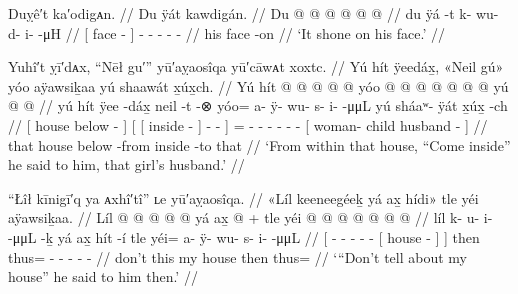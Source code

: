 \ex\label{ex:89-179-shone-on-his-face}%
%
\begingl
	\glpreamble	Duỵê′t ka′odigᴀn. //
	\glpreamble	Du ÿát kawdigán. //
	\gla	{} Du  @ {} {}
		 @ {} @ {} @ {} @ {} @ {} //
	\glb	{} du ÿá -t {}
		k- wu- d- i-  -μH //
	\glc	{}[  face - {}]
		- - - -  - //
	\gld	{} his face -on {}
		 {} {} {} {} {} //
	\glft	‘It shone on his face.’
		//
\endgl
\xe

\ex\label{ex:89-180-come-inside-that-girls-husband}%
%
\begingl
	\glpreamble	Yuhî′t ỵī′dᴀx, “Nēł gu′” yū′aỵaosîqa yū′cāwᴀt xoxtc. //
	\glpreamble	Yú hít ÿeedáx̱, «\!Neil gú\!» yóo aÿawsiḵaa yú shaawát x̱úx̱ch. //
	\gla	{} Yú hít  @ {} {}
		{} {}  @ {} {}  @ {} @ {} @ {} {}
		yóo @  @ {} @ {} @ {} @ {} @ {} @ {}
		{} yú  @ {}  @ {} {} //
	\glb	{} yú hít ÿee -dáx̱ {}
		{} {} neil -t {} {} {}  -⊗ {}
		yóo= a- ÿ- wu- s- i-  -μμL
		{} yú sháaʷ- ÿát x̱úx̱ -ch {} //
	\glc	{}[  house below - {}]
		{}[ {}[ inside - {}] \· -  - {}]
		= - - - - -  -
		{}[  woman- child husband - {}] //
	\gld	{} that house below -from {}
		{} {} inside -to {}  {} {} {} {}
		\•  {} {} {} {} {} {}
		{} that  {}  {} {} //
	\glft	‘From within that house, “Come inside” he said to him, that girl’s husband.’
		//
\endgl
\xe

\ex\label{ex:89-181-dont-tell-about-my-house}%
%
\begingl
	\glpreamble	“Łîł kīnigī′q ya ᴀxhî′tî” ʟe yū′aỵaosîqa. //
	\glpreamble	«\!Líl keeneegéeḵ yá ax̱ hídi\!» tle yéi aÿawsiḵaa. //
	\gla	{} Líl  @ {} @ {} @ {} @ {} @ {}
			{} yá ax̱  @ {} {} {} +
		tle yéi @  @ {} @ {} @ {} @ {} @ {} @ {} //
	\glb	{} líl k- u- i-  -μμL -ḵ
			{} yá ax̱ hít -í {} {}
		tle yéi= a- ÿ- wu- s- i-  -μμL //
	\glc	{}[  - - -  - -
			{}[   house - {}] {}]
		then thus= - - - -  - //
	\gld	{} don’t  {} {} {} {} {}
			{} this my house {} {} {}
		then thus=  {} {} {} {} {} {}  //
	\glft	‘“Don’t tell about my house” he said to him then.’
		//
\endgl
\xe  

